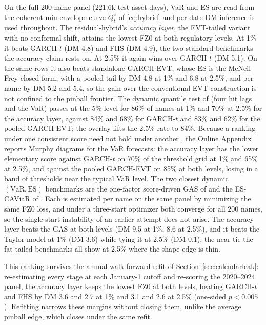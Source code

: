 \documentclass[11pt]{article}
\newcommand{\VaR}{\mathrm{VaR}}
\newcommand{\ES}{\mathrm{ES}}
\theoremstyle{remark}
\begin{document}
On the full 200-name panel ($221.6$k test asset-days), VaR and ES are read from the coherent min-envelope curve $Q^{z}_t$ of \eqref{eq:hybrid} and per-date DM inference is used throughout. The residual-hybrid's \emph{accuracy layer}, the EVT-tailed variant with no conformal shift, attains the lowest FZ0 at both regulatory levels. At 1\% it beats GARCH-$t$ (DM 4.8) and FHS (DM 4.9), the two standard benchmarks the accuracy claim rests on. At 2.5\% it again wins over GARCH-$t$ (DM 5.1). On the same rows it also beats standalone GARCH-EVT, whose ES is the McNeil--Frey closed form, with a pooled tail by DM 4.8 at 1\% and 6.8 at 2.5\%, and per name by DM 5.2 and 5.4, so the gain over the conventional EVT construction is not confined to the pinball frontier. The dynamic quantile test of \citet{engle2004caviar} (four hit lags and the VaR) passes at the 5\% level for 86\% of names at 1\% and 70\% at 2.5\% for the accuracy layer, against 84\% and 68\% for GARCH-$t$ and 83\% and 62\% for the pooled GARCH-EVT; the overlay lifts the 2.5\% rate to 84\%. Because a ranking under one consistent score need not hold under another \citep{patton2020}, the Online Appendix reports Murphy diagrams \citep{ehm2016} for the VaR forecasts: the accuracy layer has the lower elementary score against GARCH-$t$ on 70\% of the threshold grid at 1\% and 65\% at 2.5\%, and against the pooled GARCH-EVT on 85\% at both levels, losing in a band of thresholds near the typical VaR level. The two closest dynamic $(\VaR,\ES)$ benchmarks are the one-factor score-driven GAS of \citet{patton2019} and the ES-CAViaR of \citet{taylor2019}. Each is estimated per name on the same panel by minimizing the same FZ0 loss, and under a three-start optimizer both converge for all $200$ names, so the single-start instability of an earlier attempt does not arise. The accuracy layer beats the GAS at both levels (DM 9.5 at 1\%, 8.6 at 2.5\%), and it beats the Taylor model at 1\% (DM 3.6) while tying it at 2.5\% (DM 0.1), the near-tie the fat-tailed benchmarks all show at 2.5\% where the shape edge is thin.

This ranking survives the annual walk-forward refit of Section~\ref{sec:calendarleak}: re-estimating every stage at each January-1 cutoff and re-scoring the 2020--2024 panel, the accuracy layer keeps the lowest FZ0 at both levels, beating GARCH-$t$ and FHS by DM 3.6 and 2.7 at 1\% and 3.1 and 2.6 at 2.5\% (one-sided $p<0.005$). Refitting narrows these margins without closing them, unlike the average pinball edge, which closes under the same refit.
\end{document}
